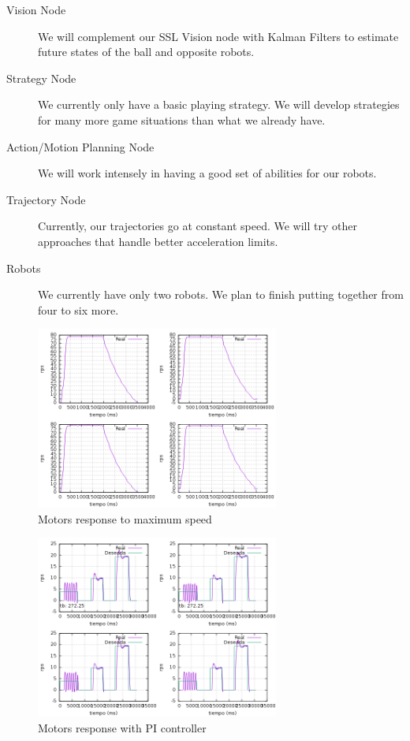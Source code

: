 \documentclass[]{llncs}
\begin{document}
\begin{description}
	\item[Vision Node] We will complement our SSL Vision node with Kalman Filters to estimate future states of the ball and opposite robots.
	\item[Strategy Node] We currently only have a basic playing strategy. We will develop strategies for many more game situations than what we already have.
	\item[Action/Motion Planning Node] We will work intensely in having a good set of abilities for our robots.
	\item[Trajectory Node] Currently, our trajectories go at constant speed. We will try other approaches that handle better acceleration limits.
	\item[Robots] We currently have only two robots. We plan to finish putting together from four to six more.
\end{description}

\begin{figure}[htb]
	\centering
	\includegraphics[width=8cm]{./pictures/motor_tests_220417-3-lines.png}
	\caption{Motors response to maximum speed}
	\label{fig:mot_max_speed}  
\end{figure}

\begin{figure}[htb]
	\centering
	\includegraphics[width=8cm]{./pictures/motor_tests_240417-1-lines_DvsR.png}
	\caption{Motors response with PI controller}
	\label{fig:mot_pi}  
\end{figure}
\end{document}
